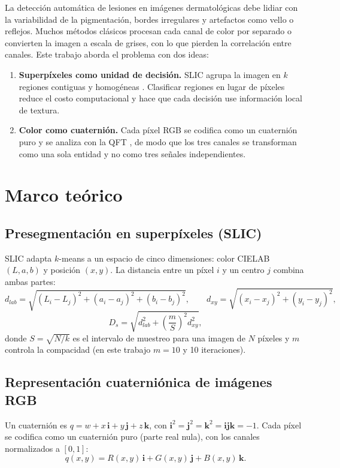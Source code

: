 \documentclass[11pt,a4paper]{article}
\begin{document}
La detección automática de lesiones en imágenes dermatológicas debe lidiar con
la variabilidad de la pigmentación, bordes irregulares y artefactos como vello o
reflejos. Muchos métodos clásicos procesan cada canal de color por separado o
convierten la imagen a escala de grises, con lo que pierden la correlación entre
canales. Este trabajo aborda el problema con dos ideas:

\begin{enumerate}
  \item \textbf{Superpíxeles como unidad de decisión.} SLIC agrupa la imagen en
  $k$ regiones contiguas y homogéneas \cite{achanta2012slic}. Clasificar
  regiones en lugar de píxeles reduce el costo computacional y hace que cada
  decisión use información local de textura.
  \item \textbf{Color como cuaternión.} Cada píxel RGB se codifica como un
  cuaternión puro y se analiza con la QFT
  \cite{sangwine1996fourier,ell2007hypercomplex}, de modo que los tres canales se
  transforman como una sola entidad y no como tres señales independientes.
\end{enumerate}

\section{Marco teórico}

\subsection{Presegmentación en superpíxeles (SLIC)}
SLIC adapta $k$-means a un espacio de cinco dimensiones: color CIELAB $(L,a,b)$
y posición $(x,y)$. La distancia entre un píxel $i$ y un centro $j$ combina
ambas partes:
\begin{equation}
  d_{lab} = \sqrt{(L_i-L_j)^2 + (a_i-a_j)^2 + (b_i-b_j)^2}, \qquad
  d_{xy}  = \sqrt{(x_i-x_j)^2 + (y_i-y_j)^2},
\end{equation}
\begin{equation}
  D_s = \sqrt{d_{lab}^2 + \left(\frac{m}{S}\right)^2 d_{xy}^2},
\end{equation}
donde $S = \sqrt{N/k}$ es el intervalo de muestreo para una imagen de $N$ píxeles
y $m$ controla la compacidad (en este trabajo $m = 10$ y 10 iteraciones).

\subsection{Representación cuaterniónica de imágenes RGB}
Un cuaternión es $q = w + x\,\mathbf{i} + y\,\mathbf{j} + z\,\mathbf{k}$, con
$\mathbf{i}^2 = \mathbf{j}^2 = \mathbf{k}^2 = \mathbf{ijk} = -1$. Cada píxel se
codifica como un cuaternión puro (parte real nula), con los canales normalizados
a $[0,1]$:
\begin{equation}
  q(x,y) = R(x,y)\,\mathbf{i} + G(x,y)\,\mathbf{j} + B(x,y)\,\mathbf{k}.
\end{equation}
\end{document}
